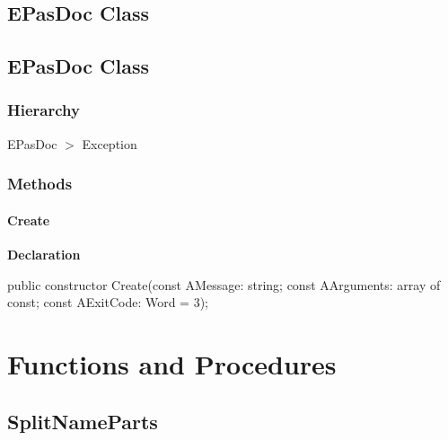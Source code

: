 \documentclass{report}
\newif\ifpdf
\begin{document}
\subsection*{\large{\textbf{EPasDoc Class}}\normalsize\hspace{1ex}\hrulefill}
\else
\subsection*{EPasDoc Class}
\fi
\label{PasDoc_Types.EPasDoc}
\subsubsection*{\large{\textbf{Hierarchy}}\normalsize\hspace{1ex}\hfill}
EPasDoc {$>$} Exception
\subsubsection*{\large{\textbf{Methods}}\normalsize\hspace{1ex}\hfill}
\paragraph*{Create}\hspace*{\fill}

\label{PasDoc_Types.EPasDoc-Create}
\begin{list}{}{
\setlength{\itemindent}{0cm}
\setlength{\listparindent}{0cm}
\setlength{\leftmargin}{\evensidemargin}
\addtolength{\leftmargin}{\tmplength}
\settowidth{\labelsep}{X}
\addtolength{\leftmargin}{\labelsep}
\setlength{\labelwidth}{\tmplength}
}
\item[\textbf{Declaration}\hfill]
\ifpdf
\begin{flushleft}
\fi
\begin{ttfamily}
public constructor Create(const AMessage: string; const AArguments: array of const; const AExitCode: Word = 3);\end{ttfamily}

\ifpdf
\end{flushleft}
\fi

\end{list}
\section{Functions and Procedures}
\ifpdf
\subsection*{\large{\textbf{SplitNameParts}}\normalsize\hspace{1ex}\hrulefill}
\else
\end{document}
